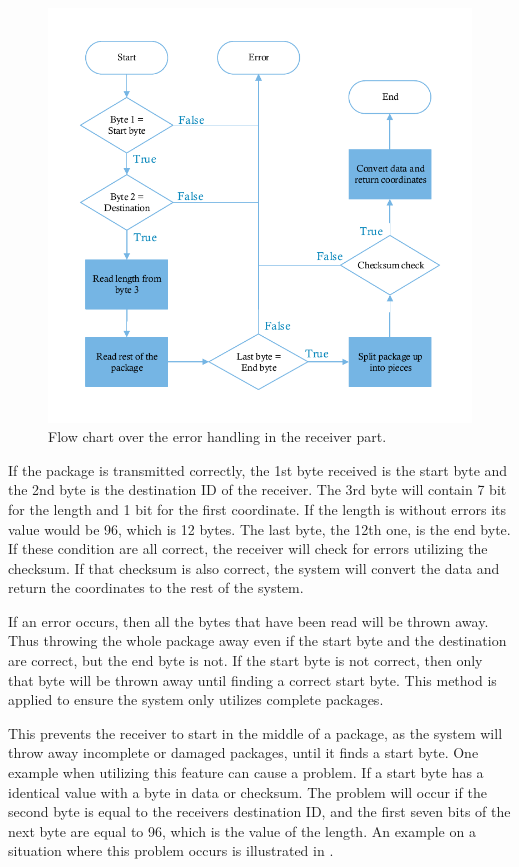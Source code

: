 \begin{figure}[H]
\centering
\includegraphics[scale=1.2]{figures/FlowReceiver.pdf}
\caption{Flow chart over the error handling in the receiver part.}
\label{FlowReceiver}
\end{figure}

If the package is transmitted correctly, the 1st byte received is the start byte and the 2nd byte is the destination ID of the receiver. The 3rd byte will contain 7 bit for the length and 1 bit for the first coordinate. If the length is without errors its value would be 96, which is 12 bytes. The last byte, the 12th one, is the end byte. If these condition are all correct, the receiver will check for errors utilizing the checksum. If that checksum is also correct, the system will convert the data and return the coordinates to the rest of the system.

If an error occurs, then all the bytes that have been read will be thrown away. Thus throwing the whole package away even if the start byte and the destination are correct, but the end byte is not. If the start byte is not correct, then only that byte will be thrown away until finding a correct start byte. This method is applied to ensure the system only utilizes complete packages.

This prevents the receiver to start in the middle of a package, as the system will throw away incomplete or damaged packages, until it finds a start byte. One example when utilizing this feature can cause a problem. If a start byte has a identical value with a byte in data or checksum. The problem will occur if the second byte is equal to the receivers destination ID, and the first seven bits of the next byte are equal to 96, which is the value of the length. An example on a situation where this problem occurs is illustrated in .

